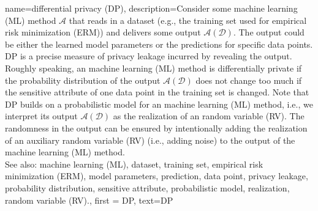 {name={differential privacy (DP)},
  description={Consider some machine learning (ML) method $\mathcal{A}$ 
  	that reads in a dataset (e.g., the training set 
  	used for empirical risk minimization (ERM)) and delivers some output $\mathcal{A}(\mathcal{D})$. The output 
  	could be either the learned model parameters or the predictions for specific data points. 
  	DP is a precise measure of privacy leakage incurred by revealing the 
  	output. Roughly speaking, an machine learning (ML) method is differentially private if the probability distribution 
  	of the output $\mathcal{A}(\mathcal{D})$ does not change too much if the sensitive attribute 
  	of one data point in the training set is changed. Note that DP 
  	builds on a probabilistic model for an machine learning (ML) method, i.e., we interpret its output $\mathcal{A}(\mathcal{D})$ 
  	as the realization of an random variable (RV). The randomness in the output can be ensured 
  	by intentionally adding the realization of an auxiliary random variable (RV) (i.e., adding noise) to 
  	the output of the machine learning (ML) method.
				\\ 
		See also: machine learning (ML), dataset, training set, empirical risk minimization (ERM), model parameters, prediction, data point, privacy leakage, probability distribution, sensitive attribute, probabilistic model, realization, random variable (RV).}, 
	first = {DP}, 
	text={DP} 
}


